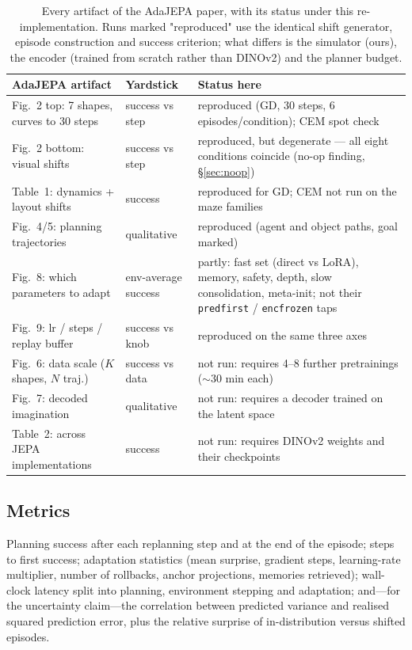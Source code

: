 \begin{table}[t]
\centering
\caption{Every artifact of the AdaJEPA paper, with its status under this re-implementation.
Runs marked "reproduced" use the identical shift generator, episode construction and success
criterion; what differs is the simulator (ours), the encoder (trained from scratch rather than
DINOv2) and the planner budget.}
\label{tab:yardstick}
\small
\begin{tabular}{p{5.4cm}p{2.6cm}p{6.2cm}}
\toprule
AdaJEPA artifact & Yardstick & Status here \\
\midrule
Fig.~2 top: 7 shapes, curves to 30 steps & success vs step & reproduced (GD, 30 steps, 6 episodes/condition); CEM spot check \\
Fig.~2 bottom: visual shifts & success vs step & reproduced, but degenerate --- all eight conditions coincide (no-op finding, \S\ref{sec:noop}) \\
Table~1: dynamics + layout shifts & success & reproduced for GD; CEM not run on the maze families \\
Fig.~4/5: planning trajectories & qualitative & reproduced (agent and object paths, goal marked) \\
Fig.~8: which parameters to adapt & env-average success & partly: fast set (direct vs LoRA), memory, safety, depth, slow consolidation, meta-init; not their \texttt{predfirst} / \texttt{encfrozen} taps \\
Fig.~9: lr / steps / replay buffer & success vs knob & reproduced on the same three axes \\
Fig.~6: data scale ($K$ shapes, $N$ traj.) & success vs data & not run: requires 4--8 further pretrainings ($\sim$30 min each) \\
Fig.~7: decoded imagination & qualitative & not run: requires a decoder trained on the latent space \\
Table~2: across JEPA implementations & success & not run: requires DINOv2 weights and their checkpoints \\
\bottomrule
\end{tabular}
\end{table}

\subsection{Metrics}

Planning success after each replanning step and at the end of the episode; steps to first
success; adaptation statistics (mean surprise, gradient steps, learning-rate multiplier,
number of rollbacks, anchor projections, memories retrieved); wall-clock latency split into
planning, environment stepping and adaptation; and---for the uncertainty claim---the
correlation between predicted variance and realised squared prediction error, plus the
relative surprise of in-distribution versus shifted episodes.
